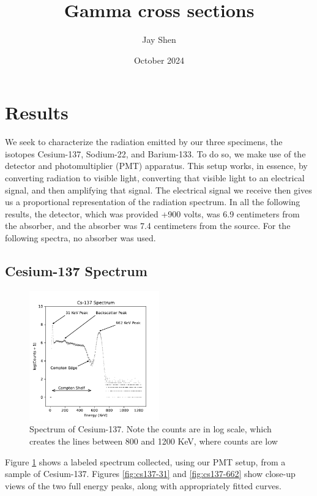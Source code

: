 \documentclass[12pt, letterpaper]{article}
\title{Gamma cross sections}
\author{Jay Shen}
\date{October 2024}
\begin{document}
\maketitle

\section{Results}

We seek to characterize the radiation emitted by our three specimens, the isotopes Cesium-137, Sodium-22, and Barium-133. To do so, we make use of the detector and photomultiplier (PMT) apparatus. This setup works, in essence, by converting radiation to visible light, converting that visible light to an electrical signal, and then amplifying that signal. The electrical signal we receive then gives us a proportional representation of the radiation spectrum. In all the following results, the detector, which was provided +900 volts, was 6.9 centimeters from the absorber, and the absorber was 7.4 centimeters from the source. For the following spectra, no absorber was used. 

\subsection{Cesium-137 Spectrum}

\begin{figure}[!h]
    \centering
    \includegraphics[width=0.5\textwidth]{experiment1/figures/cs137/spectrum.pdf}
    \caption{Spectrum of Cesium-137. Note the counts are in log scale, which creates the lines between 800 and 1200 KeV, where counts are low}
    \label{fig:cs137-spectrum}
\end{figure}

Figure \ref{fig:cs137-spectrum} shows a labeled spectrum collected, using our PMT setup, from a sample of Cesium-137. Figures \ref{fig:cs137-31} and \ref{fig:cs137-662} show close-up views of the two full energy peaks, along with appropriately fitted curves. 
\end{document}
